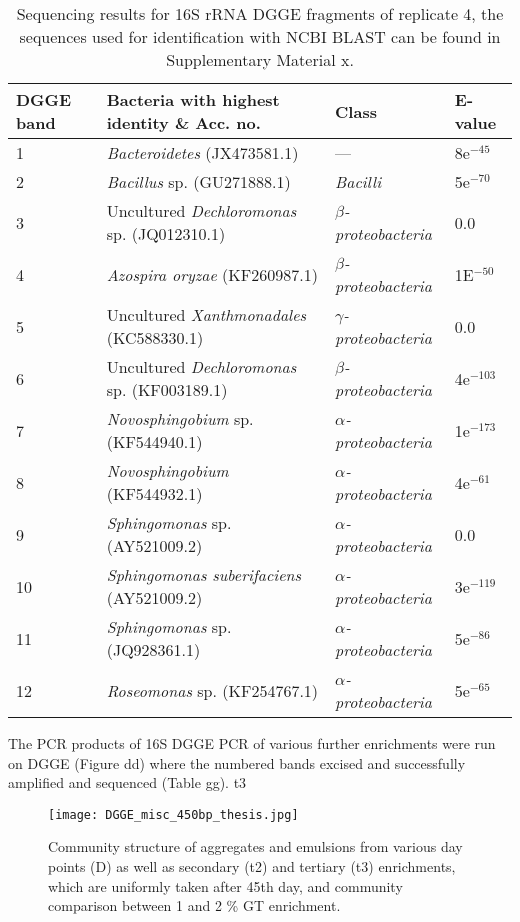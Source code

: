 \documentclass[11pt]{article}
\begin{document}
\begin{table}
\caption{Sequencing results for 16S rRNA DGGE fragments of replicate 4, the sequences used for identification with NCBI BLAST can be found in Supplementary Material  x.}
\begin{tabular}{ | l | p{7.8cm} | p{3cm} | l | }
\hline
DGGE band & Bacteria with highest identity \& Acc. no. & Class & E-value \\
\hline
1   &  \emph{Bacteroidetes} (JX473581.1) & --- & 8e$^{-45}$ \\
\hline
2  & \emph{Bacillus} sp. (GU271888.1) & \emph{Bacilli} & 5e$^{-70}$ \\
\hline
3 & Uncultured \emph{Dechloromonas} sp. (JQ012310.1) & \emph{$\beta$-proteobacteria} & 0.0 \\
\hline
4 & \emph{Azospira oryzae} (KF260987.1) & \emph{$\beta$-proteobacteria} & 1E$^{-50}$ \\
\hline
5 & Uncultured \emph{Xanthmonadales} (KC588330.1) & \emph{$\gamma$-proteobacteria} & 0.0 \\
\hline
6 & Uncultured \emph{Dechloromonas} sp. (KF003189.1) & \emph{$\beta$-proteobacteria} & 4e$^{-103}$ \\
\hline
7 & \emph{Novosphingobium} sp. (KF544940.1) & \emph{$\alpha$-proteobacteria} & 1e$^{-173}$ \\
\hline
8 & \emph{Novosphingobium} (KF544932.1) & \emph{$\alpha$-proteobacteria} & 4e$^{-61}$ \\
\hline
9 & \emph{Sphingomonas} sp. (AY521009.2) & \emph{$\alpha$-proteobacteria} & 0.0 \\
\hline
10 & \emph{Sphingomonas suberifaciens} (AY521009.2) & \emph{$\alpha$-proteobacteria} & 3e$^{-119}$ \\
\hline
11 & \emph{Sphingomonas} sp. (JQ928361.1) & \emph{$\alpha$-proteobacteria} & 5e$^{-86}$ \\
\hline
12 & \emph{Roseomonas} sp.  (KF254767.1) & \emph{$\alpha$-proteobacteria} & 5e$^{-65}$ \\
\hline
\end{tabular}

\end{table}

The PCR products of 16S DGGE PCR  of various further enrichments were run on DGGE (Figure dd) where the numbered bands excised and successfully amplified and sequenced (Table gg). t3 
\FloatBarrier
\begin{figure}
\texttt{[image: DGGE\_misc\_450bp\_thesis.jpg]}
\caption{Community structure of aggregates and emulsions from various day points (D) as well as secondary (t2) and tertiary (t3) enrichments, which are uniformly taken after 45th day, and community comparison between 1 and 2 \% GT enrichment.}
\end{figure}
\end{document}
